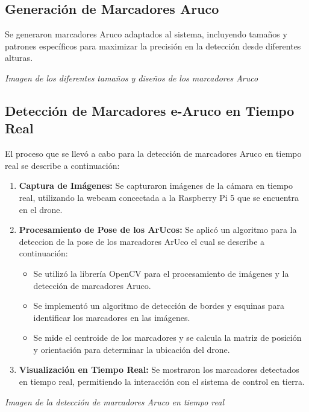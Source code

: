 \subsection{Generación de Marcadores Aruco} 
Se generaron marcadores Aruco adaptados al sistema, incluyendo tamaños y patrones específicos para maximizar la precisión en la detección desde diferentes alturas.
    \begin{center} 
        \textit{Imagen de los diferentes tamaños y diseños de los marcadores Aruco} 
    \end{center}

\subsection{Detección de Marcadores e-Aruco en Tiempo Real} 
El proceso que se llevó a cabo para la detección de marcadores Aruco en tiempo real se describe a continuación:

    \begin{enumerate} 
        \item \textbf{Captura de Imágenes:} Se capturaron imágenes de la cámara en tiempo real, utilizando la webcam concectada a la Raspberry Pi 5 que se encuentra en el drone. 
        \item \textbf{Procesamiento de Pose de los ArUcos:} Se aplicó un algoritmo para la deteccion de la pose de los marcadores ArUco el cual se describe a continuación: 
            \begin{itemize} 
                \item Se utilizó la librería OpenCV para el procesamiento de imágenes y la detección de marcadores Aruco. 
                \item Se implementó un algoritmo de detección de bordes y esquinas para identificar los marcadores en las imágenes. 
                \item Se mide el centroide de los marcadores y se calcula la matriz de posición y orientación para determinar la ubicación del drone.
             \end{itemize}
        
        \item \textbf{Visualización en Tiempo Real:} Se mostraron los marcadores detectados en tiempo real, permitiendo la interacción con el sistema de control en tierra.
    \end{enumerate}

    \begin{center} 
        \textit{Imagen de la detección de marcadores Aruco en tiempo real} 
    \end{center}

